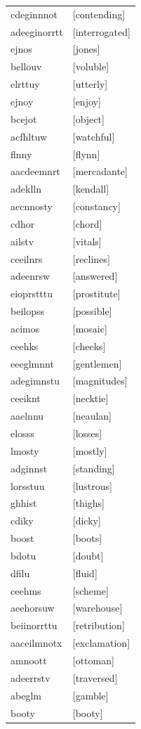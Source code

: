 \documentclass{article}
\begin{document}
\begin{tabular}{ll}
cdeginnnot & [contending] \\
adeeginorrtt & [interrogated] \\
ejnos & [jones] \\
bellouv & [voluble] \\
elrttuy & [utterly] \\
ejnoy & [enjoy] \\
bcejot & [object] \\
acfhltuw & [watchful] \\
flnny & [flynn] \\
aacdeemnrt & [mercadante] \\
adeklln & [kendall] \\
accnnosty & [constancy] \\
cdhor & [chord] \\
ailstv & [vitals] \\
ceeilnrs & [reclines] \\
adeenrsw & [answered] \\
eioprstttu & [prostitute] \\
beilopss & [possible] \\
acimos & [mosaic] \\
ceehks & [cheeks] \\
eeeglmnnt & [gentlemen] \\
adegimnstu & [magnitudes] \\
ceeiknt & [necktie] \\
aaelnnu & [neaulan] \\
elosss & [losses] \\
lmosty & [mostly] \\
adginnst & [standing] \\
lorsstuu & [lustrous] \\
ghhist & [thighs] \\
cdiky & [dicky] \\
boost & [boots] \\
bdotu & [doubt] \\
dfilu & [fluid] \\
ceehms & [scheme] \\
aeehorsuw & [warehouse] \\
beiinorrttu & [retribution] \\
aaceilmnotx & [exclamation] \\
amnoott & [ottoman] \\
adeerrstv & [traversed] \\
abeglm & [gamble] \\
booty & [booty] \\

\end{tabular}
\end{document}
